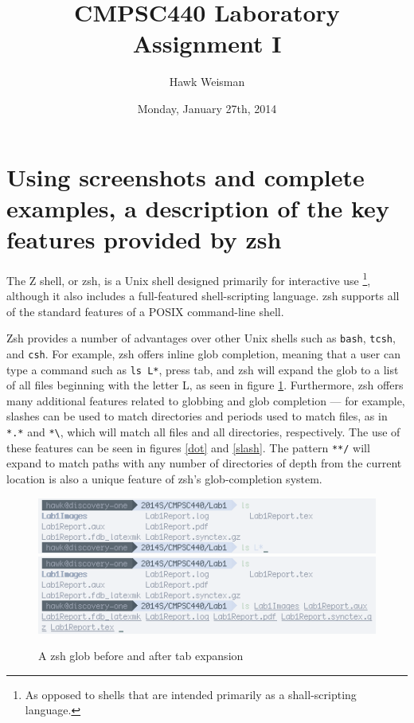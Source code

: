 \documentclass[12pt,a4paper]{article}
\author{Hawk Weisman}
\title{CMPSC440 Laboratory Assignment I}
\date{Monday, January 27th, 2014}
\begin{document}
	\maketitle
	\section{Using screenshots and complete examples, a description of the key features provided by zsh}

		The Z shell, or zsh, is a Unix shell designed primarily for interactive use \footnote{As opposed to shells that are intended primarily as a shall-scripting language.}, although it also includes a full-featured shell-scripting language. zsh supports all of the standard features of a POSIX command-line shell.

		Zsh provides a number of advantages over other Unix shells such as \lstinline{bash}, \lstinline{tcsh}, and \lstinline{csh}. For example, zsh offers inline glob completion, meaning that a user can type a command such as \lstinline{ls L*}, press tab, and zsh will expand the glob to a list of all files beginning with the letter L, as seen in figure \ref{tab}. Furthermore, zsh offers many additional features related to globbing and glob completion --- for example, slashes can be used to match directories and periods used to match files, as in \lstinline{*.*} and \lstinline{*\}, which will match all files and all directories, respectively. The use of these features can be seen in figures \ref{dot} and \ref{slash}. The pattern \lstinline{**/} will expand to match paths with any number of directories of depth from the current location is also a unique feature of zsh's glob-completion system.

		\begin{figure}[ht!]
			\includegraphics[resolution=72, scale=0.75]{Lab1Images/pretab.png}
			\includegraphics[resolution=72, scale=0.75]{Lab1Images/posttab.png}
			\caption{A zsh glob before and after tab expansion}
			\label{tab}
		\end{figure}
\end{document}
